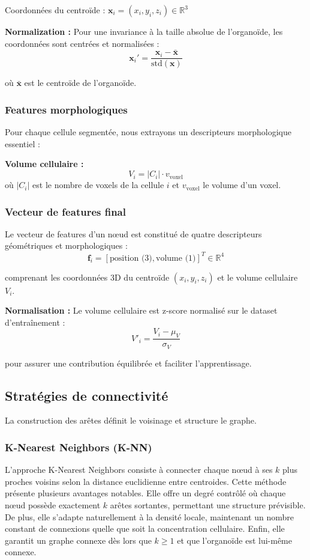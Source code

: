 Coordonnées du centroïde : $\mathbf{x}_i = (x_i, y_i, z_i) \in \mathbb{R}^3$

\textbf{Normalization :}
Pour une invariance à la taille absolue de l'organoïde, les coordonnées sont centrées et normalisées :
\[
\mathbf{x}_i' = \frac{\mathbf{x}_i - \bar{\mathbf{x}}}{\text{std}(\mathbf{x})}
\]

où $\bar{\mathbf{x}}$ est le centroïde de l'organoïde.

\subsubsection{Features morphologiques}

Pour chaque cellule segmentée, nous extrayons un descripteurs morphologique essentiel :

\textbf{Volume cellulaire :}
\[
V_i = |C_i| \cdot v_{\text{voxel}}
\]
où $|C_i|$ est le nombre de voxels de la cellule $i$ et $v_{\text{voxel}}$ le volume d'un voxel.


\subsubsection{Vecteur de features final}

Le vecteur de features d'un nœud est constitué de quatre descripteurs géométriques et morphologiques :
\[
\mathbf{f}_i = [\text{position (3)}, \text{volume (1)}]^T \in \mathbb{R}^{4}
\]

comprenant les coordonnées 3D du centroïde $(x_i, y_i, z_i)$ et le volume cellulaire $V_i$.

\textbf{Normalisation :}
Le volume cellulaire est z-score normalisé sur le dataset d'entraînement :
\[
V'_i = \frac{V_i - \mu_V}{\sigma_V}
\]

pour assurer une contribution équilibrée et faciliter l'apprentissage.

\subsection{Stratégies de connectivité}

La construction des arêtes définit le voisinage et structure le graphe.

\subsubsection{K-Nearest Neighbors (K-NN)}

L'approche K-Nearest Neighbors consiste à connecter chaque nœud à ses $k$ plus proches voisins selon la distance euclidienne entre centroides. Cette méthode présente plusieurs avantages notables. Elle offre un degré contrôlé où chaque nœud possède exactement $k$ arêtes sortantes, permettant une structure prévisible. De plus, elle s'adapte naturellement à la densité locale, maintenant un nombre constant de connexions quelle que soit la concentration cellulaire. Enfin, elle garantit un graphe connexe dès lors que $k \geq 1$ et que l'organoïde est lui-même connexe.

